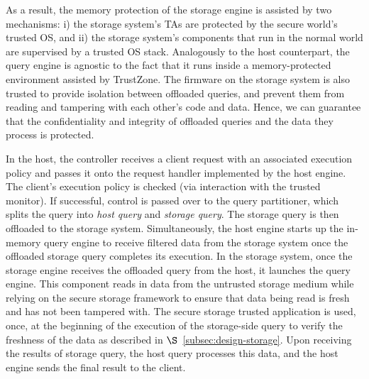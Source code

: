 As a result, the memory protection of the storage engine is assisted by two mechanisms: i) the storage system's TAs are protected by the secure world's trusted OS, and ii) the storage system's components that run in the normal world are supervised by a trusted OS stack. Analogously to the host counterpart, the query engine is agnostic to the fact that it runs inside a memory-protected environment assisted by TrustZone. The firmware on the storage system is also trusted to provide isolation between offloaded queries, and prevent them from reading and tampering with each other's code and data. Hence, we can guarantee that the confidentiality and integrity of offloaded queries and the data they process is protected.


 In the host, the controller receives a client request with an associated execution policy and passes it onto the request handler implemented by the host engine. The client's execution policy is checked (via interaction with the trusted monitor). If successful, control is passed over to the query partitioner, which splits the query into \textit{host query} and \textit{storage query}. The storage query is then offloaded to the storage system. Simultaneously, the host engine starts up the in-memory query engine to receive filtered data from the storage system once the offloaded storage query completes its execution. In the storage system, once the storage engine receives the offloaded query from the host, it launches the query engine. This component reads in data from the untrusted storage medium while relying on the secure storage framework to ensure that data being read is fresh and has not been tampered with. The secure storage trusted application is used, once, at the beginning of the execution of the storage-side query to verify the freshness of the data as described in $\S$~\ref{subsec:design-storage}. Upon receiving the results of storage query, the host query processes this data, and the host engine sends the final result to the client. 


